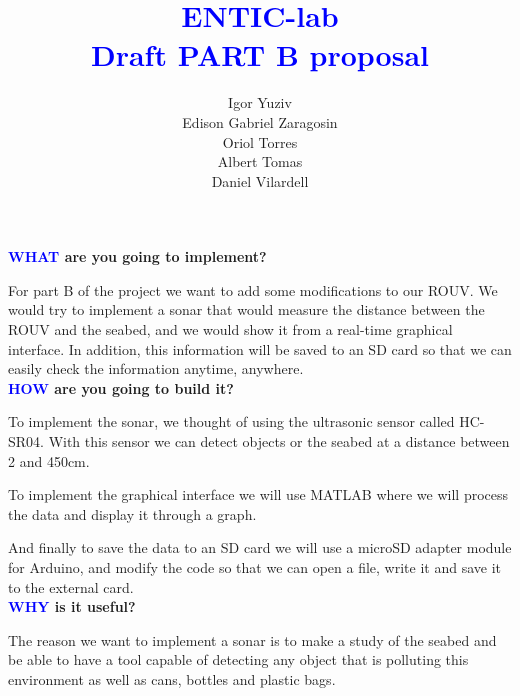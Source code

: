 \documentclass[12pt, a4papre]{article}
\author{	
		Igor Yuziv\\
		Edison Gabriel Zaragosin\\
		Oriol Torres\\
		Albert Tomas\\
		Daniel Vilardell}
\title{\textbf{\textcolor{blue}{ENTIC-lab\\
	Draft PART B proposal}}}
\date{}
\begin{document}
	\maketitle

	\textbf{\textcolor{blue}{WHAT} are you going to implement?}
	
	
For part B of the project we want to add some modifications to our ROUV.
We would try to implement a sonar that would measure the distance between the ROUV and the seabed, and we would show it from a real-time graphical interface.
In addition, this information will be saved to an SD card so that we can easily check the information anytime, anywhere.
\\
	
	
	\textbf{\textcolor{blue}{HOW} are you going to build it?}
	
	
To implement the sonar, we thought of using the ultrasonic sensor called HC-SR04. With this sensor we can detect objects or the seabed at a distance between 2 and 450cm.

To implement the graphical interface we will use MATLAB where we will process the data and display it through a graph.

And finally to save the data to an SD card we will use a microSD adapter module for Arduino, and modify the code so that we can open a file, write it and save it to the external card.
\\
	


	
	\textbf{\textcolor{blue}{WHY} is it useful?}
	
The reason we want to implement a sonar is to make a study of the seabed and be able to have a tool capable of detecting any object that is polluting this environment as well as cans, bottles and plastic bags.




	

	
	
\end{document}
